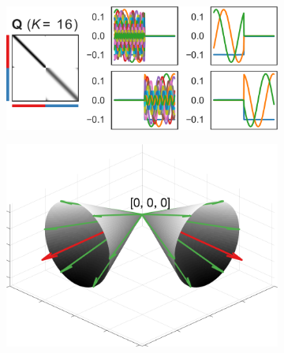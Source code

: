 \documentclass[twoside,11pt]{article}
\begin{document}
\begin{figure}[t]
\begin{minipage}{.4\linewidth}
\begin{subfigure}{.643\linewidth}
		\caption{}
		\label{fig:2circlesGramian}
	\end{subfigure}%
	\\
	\begin{subfigure}{\linewidth}
		\includegraphics[width=\linewidth]{clustering/circles_eigendecomposition3.pdf}
		\caption{}
		\label{fig:circles_eigendecomposition3}
	\end{subfigure}%
    \end{minipage}
	\hspace{2em}
	\begin{subfigure}{.25\linewidth}
		\centering
		\includegraphics[width=\linewidth]{additional/two_cones_structure}
		\caption{}
		\label{fig:two_cones_structure}
	\end{subfigure}
	

\end{figure}
\end{document}
